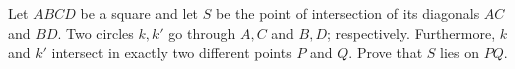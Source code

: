 Let $ABCD$ be a square and let $S$ be the point of intersection of its diagonals $AC$ and $BD$. Two circles $k,k'$ go through $A,C$ and $B,D$; respectively. Furthermore, $k$ and $k'$ intersect in exactly two different points $P$ and $Q$. Prove that $S$ lies on $PQ$.